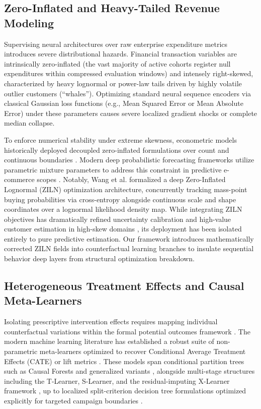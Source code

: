 \documentclass[10pt, conference]{IEEEtran}
\begin{document}
\subsection{Zero-Inflated and Heavy-Tailed Revenue Modeling}
Supervising neural architectures over raw enterprise expenditure metrics introduces severe distributional hazards. Financial transaction variables are intrinsically zero-inflated (the vast majority of active cohorts register null expenditures within compressed evaluation windows) and intensely right-skewed, characterized by heavy lognormal or power-law tails driven by highly volatile outlier customers (``whales''). Optimizing standard neural sequence encoders via classical Gaussian loss functions (e.g., Mean Squared Error or Mean Absolute Error) under these parameters causes severe localized gradient shocks or complete median collapse.

To enforce numerical stability under extreme skewness, econometric models historically deployed decoupled zero-inflated formulations over count and continuous boundaries \cite{Mullahy1986, Lambert1992}. Modern deep probabilistic forecasting frameworks utilize parametric mixture parameters to address this constraint in predictive e-commerce scopes \cite{Pollak2021}. Notably, Wang et al. \cite{Wang2019} formalized a deep Zero-Inflated Lognormal (ZILN) optimization architecture, concurrently tracking mass-point buying probabilities via cross-entropy alongside continuous scale and shape coordinates over a lognormal likelihood density map. While integrating ZILN objectives has dramatically refined uncertainty calibration and high-value customer estimation in high-skew domains \cite{Zheng2025}, its deployment has been isolated entirely to pure predictive estimation. Our framework introduces mathematically corrected ZILN fields into counterfactual learning branches to insulate sequential behavior deep layers from structural optimization breakdown.

\subsection{Heterogeneous Treatment Effects and Causal Meta-Learners}
Isolating prescriptive intervention effects requires mapping individual counterfactual variations within the formal potential outcomes framework \cite{Rubin1974, Rosenbaum1983}. The modern machine learning literature has established a robust suite of non-parametric meta-learners optimized to recover Conditional Average Treatment Effects (CATE) or lift metrics \cite{Radcliffe2007, Gutierrez2017}. These models span conditional partition trees such as Causal Forests \cite{Athey2016, Wager2018} and generalized variants \cite{Athey2019}, alongside multi-stage structures including the T-Learner, S-Learner, and the residual-imputing X-Learner framework \cite{Kunzel2019}, up to localized split-criterion decision tree formulations optimized explicitly for targeted campaign boundaries \cite{Rzepakowski2012}. 
\end{document}

